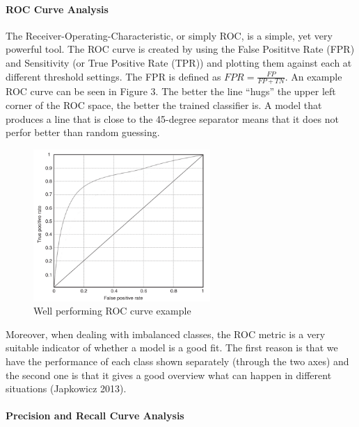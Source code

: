 \documentclass[12pt,]{article}
\let\oldparagraph\paragraph
\renewcommand{\paragraph}[1]{\oldparagraph{#1}\mbox{}}
\begin{document}
\hypertarget{roc-curve-analysis}{%
\paragraph{ROC Curve Analysis}\label{roc-curve-analysis}}

The Receiver-Operating-Characteristic, or simply ROC, is a simple, yet
very powerful tool. The ROC curve is created by using the False
Posititve Rate (FPR) and Sensitivity (or True Positive Rate (TPR)) and
plotting them against each at different threshold settings. The FPR is
defined as \(FPR=\frac{FP}{FP+TN}\). An example ROC curve can be seen in
Figure 3. The better the line ``hugs'' the upper left corner of the ROC
space, the better the trained classifier is. A model that produces a
line that is close to the 45-degree separator means that it does not
perfor better than random guessing.

\begin{figure}
\centering
\includegraphics[width=0.6\textwidth,height=\textheight]{figures/roc_curve_example.png}
\caption{Well performing ROC curve example}
\end{figure}

Moreover, when dealing with imbalanced classes, the ROC metric is a very
suitable indicator of whether a model is a good fit. The first reason is
that we have the performance of each class shown separately (through the
two axes) and the second one is that it gives a good overview what can
happen in different situations (Japkowicz 2013).

\hypertarget{precision-and-recall-curve-analysis}{%
\paragraph{Precision and Recall Curve
Analysis}\label{precision-and-recall-curve-analysis}}
\end{document}
